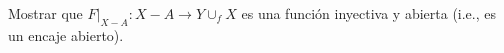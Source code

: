 \begin{ejercicio}
        Mostrar que $F|_{X-A}:X-A\to Y\cup_f X$ es una función inyectiva y abierta (i.e., es un encaje abierto).
    \end{ejercicio}

\begin{demostracion}

\end{demostracion}
